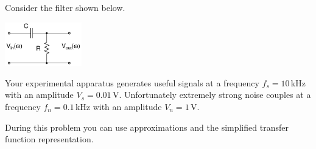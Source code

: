 \documentclass[letterpaper,addpoints,answers]{exam}
\begin{document}
\begin{questions}
 
\pagebreak

\question

Consider the filter shown below.
\begin{center}
 \includegraphics[width=0.25\textwidth]{./schematics/rc_high_pass}
\end{center}


\pagebreak

\question

Your experimental apparatus generates useful signals at a frequency $f_s = 10$\,kHz 
with an amplitude $V_s = 0.01$\,V.  Unfortunately extremely strong noise couples
at a frequency $f_n = 0.1$\,kHz with an amplitude $V_n = 1$\,V.

During this problem you can use approximations and the simplified transfer
function representation.

\begin{parts}

\end{parts}
\end{questions}
\end{document}
